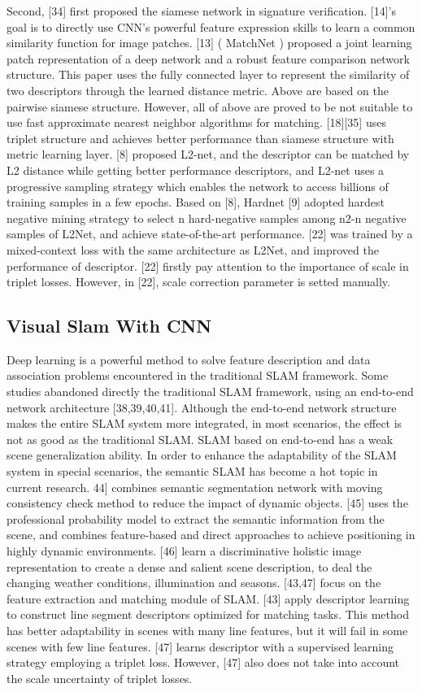 \documentclass[letterpaper, 10 pt, conference]{ieeeconf}  %
\begin{document}
Second, [34] first proposed the siamese network in signature verification. [14]’s goal is to directly use CNN's powerful feature expression skills to learn a common similarity function for image patches. [13] ( MatchNet ) proposed a joint learning patch representation of a deep network and a robust feature comparison network structure. This paper uses the fully connected layer to represent the similarity of two descriptors through the learned distance metric. Above are based on the pairwise siamese structure. However, all of above are proved to be not suitable to use fast approximate nearest neighbor algorithms for matching. [18][35] uses triplet structure and achieves better performance than siamese structure with metric learning layer. [8] proposed L2-net, and the descriptor can be matched by L2 distance while getting better performance descriptors, and L2-net uses a progressive sampling strategy which enables the network to access billions of training samples in a few epochs. Based on [8], Hardnet [9] adopted hardest negative mining strategy to select n hard-negative samples among n2-n negative samples of L2Net, and achieve state-of-the-art performance.  [22] was trained by a mixed-context loss with the same architecture as L2Net, and improved the performance of descriptor. [22] firstly pay attention to the importance of scale in triplet losses. However, in [22], scale correction parameter is setted manually.
\subsection{Visual Slam With CNN}
Deep learning is a powerful method to solve feature description and data association problems encountered in the traditional SLAM framework. Some studies abandoned directly the traditional SLAM framework, using an end-to-end network architecture [38,39,40,41]. Although the end-to-end network structure makes the entire SLAM system more integrated, in most scenarios, the effect is not as good as the traditional SLAM. SLAM based on end-to-end has a weak scene generalization ability. In order to enhance the adaptability of the SLAM system in special scenarios, the semantic SLAM has become a hot topic in current research. 44] combines semantic segmentation network with moving consistency check method to reduce the impact of dynamic objects. [45] uses the professional probability model to extract the semantic information from the scene, and combines feature-based and direct approaches to achieve positioning in highly dynamic environments. [46] learn a discriminative holistic image representation to create a dense and salient scene description, to deal the changing weather conditions, illumination and seasons. 
[43,47] focus on the feature extraction and matching module of  SLAM. [43] apply descriptor learning to construct line segment descriptors optimized for matching tasks. This method has better adaptability in scenes with many line features, but it will fail in some scenes with few line features. [47] learns descriptor with  a  supervised learning strategy employing a triplet loss. However, [47] also does not take into account the scale uncertainty of triplet losses.
\end{document}
